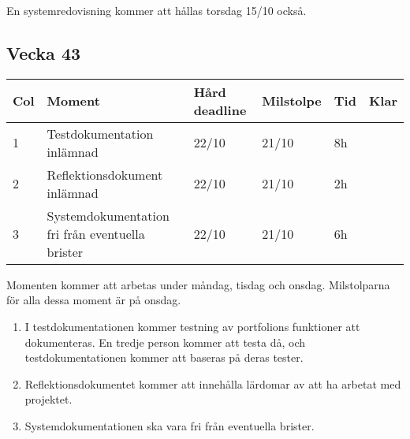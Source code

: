 \documentclass{TDP003mall}
\begin{document}
En systemredovisning kommer att hållas torsdag 15/10 också.

\subsection*{Vecka 43}
\begin{table}[!h]
\begin{tabularx}{\linewidth}{|l|X|l|l|l|l|}
\hline
Col & Moment & Hård deadline & Milstolpe & Tid & Klar \\\hline
1 & Testdokumentation inlämnad & 22/10 & 21/10 & 8h \\\hline
2 & Reflektionsdokument inlämnad & 22/10 & 21/10 & 2h \\\hline
3 & Systemdokumentation fri från eventuella brister & 22/10 & 21/10 & 6h \\\hline
\end{tabularx}
\end{table}

Momenten kommer att arbetas under måndag, tisdag och onsdag. Milstolparna för alla dessa moment är på onsdag.

\begin{enumerate}
\item
  I testdokumentationen kommer testning av portfolions funktioner att dokumenteras. En tredje person kommer att testa då, och testdokumentationen kommer att baseras på deras tester.

\item
  Reflektionsdokumentet kommer att innehålla lärdomar av att ha arbetat med projektet.

\item
  Systemdokumentationen ska vara fri från eventuella brister.
\end{enumerate}
\end{document}

